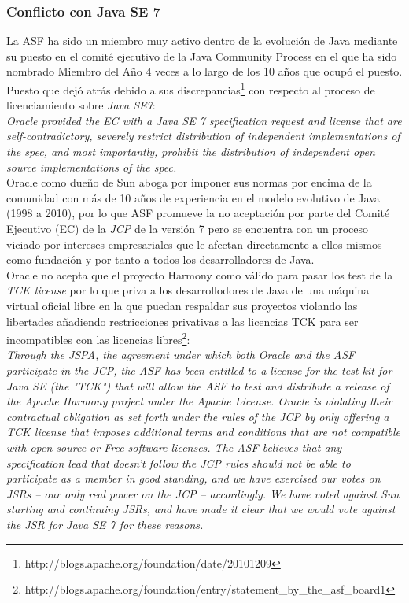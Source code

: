 \documentclass[11pt]{scrartcl}
\begin{document}
\subsubsection{Conflicto con Java SE 7}

La ASF ha sido un miembro muy activo dentro de la evolución de Java mediante su puesto en el comité ejecutivo de la Java Community Process en el que ha sido nombrado Miembro del Año 4 veces a lo largo de los 10 años que ocupó el puesto. Puesto que dejó atrás debido a sus discrepancias\footnote{http://blogs.apache.org/foundation/date/20101209} con respecto al proceso de licenciamiento sobre \emph{Java SE7}:\\

    \emph{Oracle provided the EC with a Java SE 7 specification request and license that are self-contradictory, severely restrict distribution of independent implementations of the spec, and most importantly, prohibit the distribution of independent open source implementations of the spec.}\\
    
Oracle como dueño de Sun aboga por imponer sus normas por encima de la comunidad con más de 10 años de experiencia en el modelo evolutivo de Java (1998 a 2010), por lo que ASF promueve la no aceptación por parte del Comité Ejecutivo (EC) de la \emph{JCP} de la versión 7 pero se encuentra con un proceso viciado por intereses empresariales que le afectan directamente a ellos mismos como fundación y por tanto a todos los desarrolladores de Java.\\

Oracle no acepta que el proyecto Harmony como válido para pasar los test de la \emph{TCK license} por lo que priva a los desarrollodores de Java de una máquina virtual oficial libre en la que puedan respaldar sus proyectos violando las libertades añadiendo restricciones privativas a las licencias TCK para ser incompatibles con las licencias libres\footnote{http://blogs.apache.org/foundation/entry/statement\_by\_the\_asf\_board1}:\\

    \emph{Through the JSPA, the agreement under which both Oracle and the ASF participate in the JCP, the ASF has been entitled to a license for the test kit for Java SE (the "TCK") that will allow the ASF to test and distribute a release of the Apache Harmony project under the Apache License. Oracle is violating their contractual obligation as set forth under the rules of the JCP by only offering a TCK license that imposes additional terms and conditions that are not compatible with open source or Free software licenses. The ASF believes that any specification lead that doesn't follow the JCP rules should not be able to participate as a member in good standing, and we have exercised our votes on JSRs -- our only real power on the JCP -- accordingly.  We have voted against Sun starting and continuing JSRs, and have made it clear that we would vote against the JSR for Java SE 7 for these reasons.}
\end{document}
